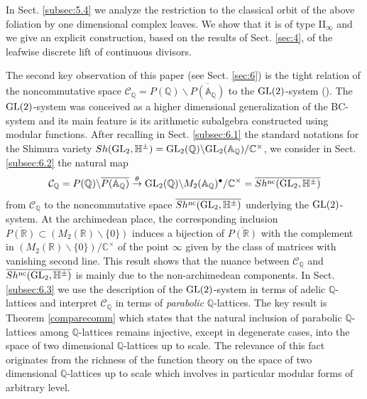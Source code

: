 \documentclass[graybox, envcountsect%
]{svmult}
\def\GL{{\rm GL}}
\def\A{{\mathbb A}}
\def\C{{\mathbb C}}
\def\Q{{\mathbb Q}}
\def\R{{\mathbb R}}
\def\H{{\mathbb H}}
\def\cC{{\mathcal C}}
\def\caq{{\cC_\Q}}
\begin{document}
In Sect.  \ref{subsec:5.4} we analyze the restriction to the classical orbit of the above foliation by one dimensional complex leaves. We show that it is of type II$_\infty$ and we give an explicit construction, based on the results of Sect.  \ref{sec:4}, of the leafwise discrete lift of continuous divisors. 

The second key observation of this paper (see Sect.  \ref{sec:6})  is the tight relation of  the noncommutative space $\caq=P(\Q)\backslash
\overline{P(\A_\Q)}$  to the $\GL(2)$-system (\cite{cmbook}). The $\GL(2)$-system was conceived as a higher dimensional generalization of the BC-system and its main  feature is its arithmetic subalgebra constructed using modular functions. After recalling in Sect.  \ref{subsec:6.1} the standard notations for the Shimura variety $Sh(\GL_2,\H^\pm)=\GL_2(\Q)\backslash
\GL_2(\A_\Q)/\C^\times$, 
 we consider in Sect.  \ref{subsec:6.2} the natural map
 \begin{equation}\label{P2gl20intro}
	\caq=P(\Q)\backslash
\overline{P(\A_\Q)}\stackrel{\theta}{\to} \GL_2(\Q)\backslash
M_2(\A_\Q)^\bullet /\C^\times	=\overline{Sh^{\rm nc}(\GL_2,\H^\pm)}
\end{equation}
 from $\caq$ to the noncommutative space $\overline{Sh^{\rm nc}(\GL_2,\H^\pm)}$ underlying the $\GL(2)$-system. At the archimedean place, the corresponding inclusion $\overline{P(\R)}\subset (M_2(\R)\smallsetminus
\{0 \})$ induces a bijection of $\overline{P(\R)}$ with the complement in $(M_2(\R)\smallsetminus
\{0 \})/\C^\times$ of the point $\infty$ given by the class of matrices with vanishing second line. This result shows that the nuance between $\caq$ and $\overline{Sh^{\rm nc}(\GL_2,\H^\pm)}$ is mainly due to the non-archimedean components. In Sect.  \ref{subsec:6.3} we use the description of the $\GL(2)$-system in terms of adelic $\Q$-lattices and interpret $\caq$   in terms of {\em parabolic} $\Q$-lattices. The key result is Theorem \ref{comparecomm} which states that the natural inclusion of parabolic $\Q$-lattices among $\Q$-lattices  remains injective, except in degenerate cases, into the space of two dimensional $\Q$-lattices up to scale. The relevance of this fact originates from the richness of the function theory on the space of two dimensional $\Q$-lattices up to scale which involves in particular  modular forms of arbitrary level.
\end{document}
